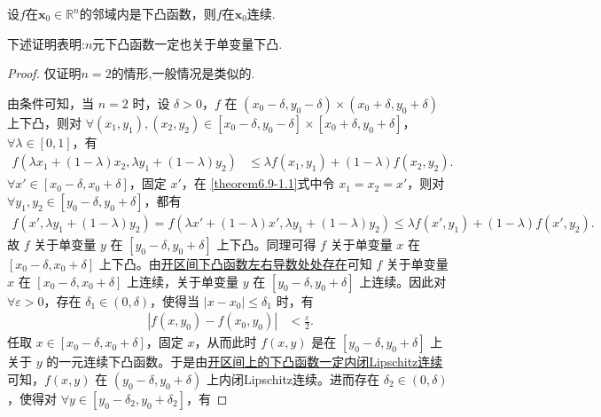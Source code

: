 \documentclass[../../main.tex]{subfiles}%
\begin{document}
\begin{theorem}\label{theorem:邻域上下凸的函数一定在这点连续}
设\(f\)在\(\mathbf{x}_0\in\mathbb{R}^n\)的邻域内是下凸函数，则\(f\)在\(\mathbf{x}_0\)连续.
\end{theorem}
\begin{note}
下述证明表明:$n$元下凸函数一定也关于单变量下凸.
\end{note}
\begin{proof}

仅证明$n=2$的情形,一般情况是类似的.

由条件可知，当 \(n = 2\) 时，设 \(\delta>0\)，\(f\) 在 \((x_0 - \delta, y_0 - \delta)\times(x_0 + \delta, y_0 + \delta)\) 上下凸，则对 \(\forall (x_1,y_1),(x_2,y_2)\in [x_0 - \delta, y_0 - \delta]\times[x_0 + \delta, y_0 + \delta]\)，\(\forall \lambda\in[0,1]\)，有
\begin{align}
f(\lambda x_1 + (1 - \lambda)x_2,\lambda y_1 + (1 - \lambda)y_2) &\leqslant \lambda f(x_1,y_1)+(1 - \lambda)f(x_2,y_2). \label{theorem6.9-1.1}
\end{align}
\(\forall x'\in [x_0 - \delta, x_0 + \delta]\)，固定 \(x'\)，在 \eqref{theorem6.9-1.1}式中令 \(x_1 = x_2 = x'\)，则对 \(\forall y_1,y_2\in [y_0 - \delta, y_0 + \delta]\)，都有
\begin{align*}
f(x',\lambda y_1 + (1 - \lambda)y_2) = f(\lambda x' + (1 - \lambda)x',\lambda y_1 + (1 - \lambda)y_2) 
\leqslant \lambda f(x',y_1)+(1 - \lambda)f(x',y_2).
\end{align*}
故 \(f\) 关于单变量 \(y\) 在 \([y_0 - \delta, y_0 + \delta]\) 上下凸。同理可得 \(f\) 关于单变量 \(x\) 在 \([x_0 - \delta, x_0 + \delta]\) 上下凸。由\hyperref[theorem:开区间下凸函数左右导数处处存在]{开区间下凸函数左右导数处处存在}可知 \(f\) 关于单变量 \(x\) 在 \([x_0 - \delta, x_0 + \delta]\) 上连续，关于单变量 \(y\) 在 \([y_0 - \delta, y_0 + \delta]\) 上连续。因此对 \(\forall \varepsilon>0\)，存在 \(\delta_1\in(0,\delta)\)，使得当 \(|x - x_0|\leqslant\delta_1\) 时，有
\begin{align}
|f(x,y_0) - f(x_0,y_0)| &< \frac{\varepsilon}{2}. \label{theorem6.9-2.1}
\end{align}
任取 \(x\in [x_0 - \delta, x_0 + \delta]\)，固定 \(x\)，从而此时 \(f(x,y)\) 是在 \([y_0 - \delta, y_0 + \delta]\) 上关于 \(y\) 的一元连续下凸函数。于是由\hyperref[theorem:开区间上的下凸函数一定内闭Lipschitz连续]{开区间上的下凸函数一定内闭Lipschitz连续}可知，\(f(x,y)\) 在 \((y_0 - \delta, y_0 + \delta)\) 上内闭Lipschitz连续。进而存在 \(\delta_2\in(0,\delta)\)，使得对 \(\forall y\in [y_0 - \delta_2, y_0 + \delta_2]\)，有

\end{proof}
\end{document}
